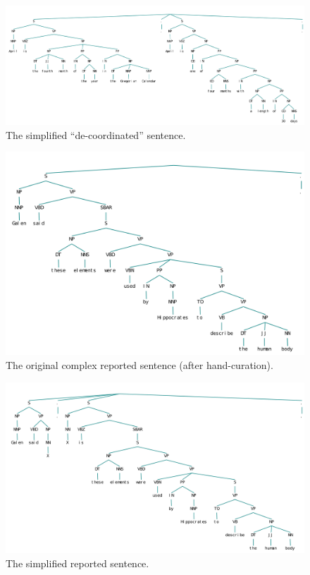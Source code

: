 \documentclass{article}
\begin{document}
\begin{figure}
\includegraphics[scale=.41]{simp_coord}
\caption{The simplified ``de-coordinated'' sentence.}
\end{figure}

\begin{figure}
\includegraphics[scale=.6]{comp_quot}
\caption{The original complex reported sentence (after hand-curation).}
\end{figure}

\begin{figure}
\includegraphics[scale=.56]{simp_quot}
\caption{The simplified reported sentence.}
\end{figure}
\end{document}
